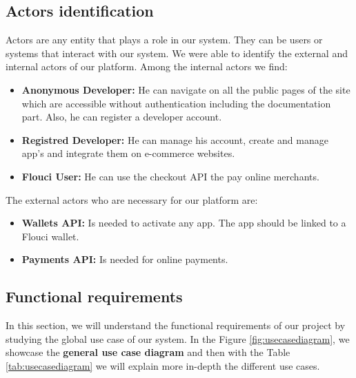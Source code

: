 \begin{spacing}{1.2}
\subsection{Actors identification}
Actors are any entity that plays a role in our system. They can be users or systems that interact with our system. We were able to identify the external and internal actors of our platform. 
\newline
Among the internal actors we find:
\begin{itemize}
  \item \textbf{Anonymous Developer:} He can navigate on all the public pages of the site which are
accessible without authentication including the documentation part. Also, he can register a developer account.
  \item \textbf{Registred Developer:} He can manage his account, create and manage app's and integrate them on e-commerce websites.
  \item \textbf{Flouci User:}  He can use the checkout API the pay online merchants.
\end{itemize}
The external actors who are necessary for our platform are:
\begin{itemize}
  \item \textbf{Wallets API:} Is needed to activate any app. The app should be linked to a Flouci wallet.
  \item \textbf{Payments API:} Is needed for online payments.
\end{itemize}
\subsection{Functional requirements}
In this section, we will understand the functional requirements of our project by studying the global use case of our system.
	\newline In the Figure \ref{fig:usecasediagram}, we showcase the \textbf{general use case diagram} and then with the Table \ref{tab:usecasediagram} we will explain more in-depth the different use cases.
	

\end{spacing}
